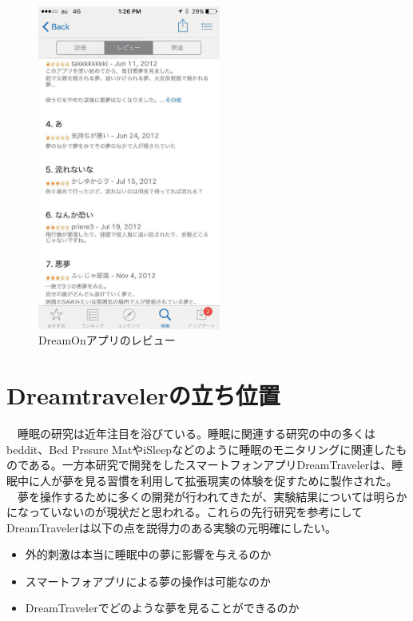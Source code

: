 \begin{figure}[htbp]
\begin{center}
\includegraphics[width=6cm]{eps/dreamOn.eps}
\caption{DreamOnアプリのレビュー}
\label{DreamOnImage}
\end{center}
\end{figure}

\section{Dreamtravelerの立ち位置}
　睡眠の研究は近年注目を浴びている。睡眠に関連する研究の中の多くはbeddit\cite{beddit}、Bed Prssure MatやiSleep\cite{iSleep}などのように睡眠のモニタリングに関連したものである。一方本研究で開発をしたスマートフォンアプリDreamTravelerは、睡眠中に人が夢を見る習慣を利用して拡張現実の体験を促すために製作された。\\
　夢を操作するために多くの開発が行われてきたが、実験結果については明らかになっていないのが現状だと思われる。これらの先行研究を参考にしてDreamTravelerは以下の点を説得力のある実験の元明確にしたい。

\begin{itemize}
\item 外的刺激は本当に睡眠中の夢に影響を与えるのか
\item スマートフォアプリによる夢の操作は可能なのか
\item DreamTravelerでどのような夢を見ることができるのか
\end{itemize}
